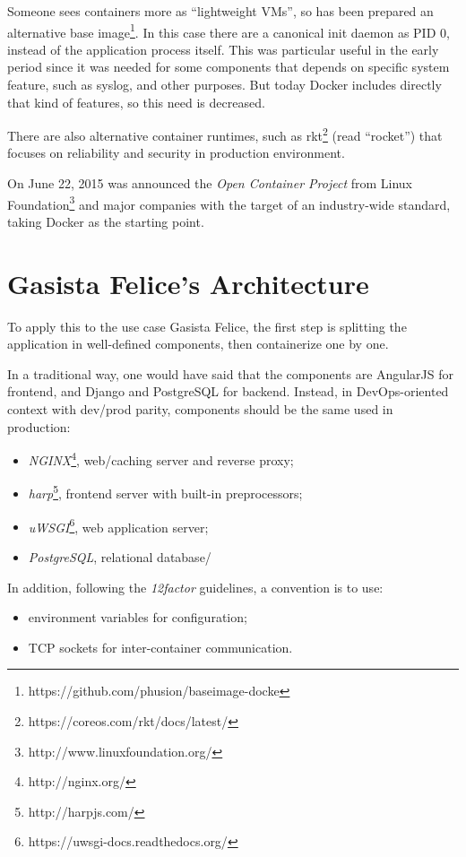 Someone sees containers more as ``lightweight VMs'', so has been
prepared an alternative base image\footnote{https://github.com/phusion/baseimage-docke}. In this case there are a
canonical init daemon as PID 0, instead of the application process
itself. This was particular useful in the early period since it was
needed for some components that depends on specific system feature, such
as syslog, and other purposes. But today Docker includes directly that
kind of features, so this need is decreased.

There are also alternative container runtimes, such as rkt\footnote{https://coreos.com/rkt/docs/latest/} (read ``rocket'') that focuses on reliability and security in production environment.

On June 22, 2015 was announced the \textit{Open Container
Project}\cite{OpenContainerProject} from Linux Foundation\footnote{http://www.linuxfoundation.org/} and
major companies with the target of an industry-wide standard, taking
Docker as the starting point.

\section{Gasista Felice's
Architecture}\label{gasista-felices-architecture}

To apply this to the use case Gasista Felice, the first step is splitting the application in well-defined components, then containerize one by one.

In a traditional way, one would have said that the components are AngularJS for frontend, and Django and PostgreSQL for backend. Instead, in DevOps-oriented context with dev/prod parity, components should be the same used in production:
\begin{itemize}

\item
  \textit{NGINX}\footnote{http://nginx.org/}, web/caching server and reverse proxy;
\item
  \textit{harp}\footnote{http://harpjs.com/}, frontend server with built-in preprocessors;
\item
  \textit{uWSGI}\footnote{https://uwsgi-docs.readthedocs.org/}, web application server;
\item
  \textit{PostgreSQL}, relational database/
\end{itemize}

In addition, following the \textit{12factor} guidelines, a convention is to use:
\begin{itemize}

\item
  environment variables for configuration;
\item
  TCP sockets for inter-container communication.
\end{itemize}

